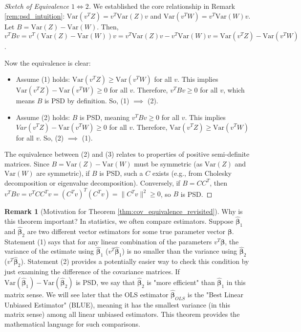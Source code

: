 \documentclass[11pt]{article}
\theoremstyle{definition}
\newtheorem{remark}[theorem]{Remark}
\newcommand{\Var}{\mathrm{Var}} %
\newcommand{\T}{^T} %
\newcommand{\bbeta}{\bm{\beta}} %
\newcommand{\bhat}[1]{\hat{\bm{#1}}} %
\begin{document}
\begin{proof}[Sketch of Equivalence $1 \iff 2$]
We established the core relationship in Remark \ref{rem:psd_intuition}: $\Var(v\T Z) = v\T \Var(Z) v$ and $\Var(v\T W) = v\T \Var(W) v$.
Let $B = \Var(Z) - \Var(W)$.
Then, $v\T B v = v\T (\Var(Z) - \Var(W)) v = v\T \Var(Z) v - v\T \Var(W) v = \Var(v\T Z) - \Var(v\T W)$.

Now the equivalence is clear:
\begin{itemize}
    \item Assume (1) holds: $\Var(v\T Z) \ge \Var(v\T W)$ for all $v$. This implies $\Var(v\T Z) - \Var(v\T W) \ge 0$ for all $v$. Therefore, $v\T B v \ge 0$ for all $v$, which means $B$ is PSD by definition. So, (1) $\implies$ (2).
    \item Assume (2) holds: $B$ is PSD, meaning $v\T B v \ge 0$ for all $v$. This implies $Var(v\T Z) - \Var(v\T W) \ge 0$ for all $v$. Therefore, $\Var(v\T Z) \ge \Var(v\T W)$ for all $v$. So, (2) $\implies$ (1).
\end{itemize}
The equivalence between (2) and (3) relates to properties of positive semi-definite matrices. Since $B = \Var(Z) - \Var(W)$ must be symmetric (as $\Var(Z)$ and $\Var(W)$ are symmetric), if $B$ is PSD, such a $C$ exists (e.g., from Cholesky decomposition or eigenvalue decomposition). Conversely, if $B=CC\T$, then $v\T B v = v\T C C\T v = (C\T v)\T (C\T v) = \| C\T v \|^2 \ge 0$, so $B$ is PSD.
\end{proof}

\begin{remark}[Motivation for Theorem \ref{thm:cov_equivalence_revisited}]
\label{rem:motivation_cov_compare}
Why is this theorem important? In statistics, we often compare estimators. Suppose $\bhat{\beta}_1$ and $\bhat{\beta}_2$ are two different vector estimators for some true parameter vector $\bbeta$. Statement (1) says that for any linear combination of the parameters $v\T \bbeta$, the variance of the estimate using $\bhat{\beta}_1$ ($v\T \bhat{\beta}_1$) is no smaller than the variance using $\bhat{\beta}_2$ ($v\T \bhat{\beta}_2$). Statement (2) provides a potentially easier way to check this condition by just examining the difference of the covariance matrices. If $\Var(\bhat{\beta}_1) - \Var(\bhat{\beta}_2)$ is PSD, we say that $\bhat{\beta}_2$ is "more efficient" than $\bhat{\beta}_1$ in this matrix sense. We will see later that the OLS estimator $\bhat{\beta}_{OLS}$ is the "Best Linear Unbiased Estimator" (BLUE), meaning it has the smallest variance (in this matrix sense) among all linear unbiased estimators. This theorem provides the mathematical language for such comparisons.
\end{remark}
\end{document}
